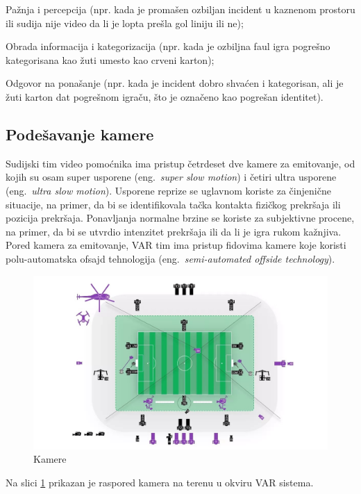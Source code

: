 \documentclass[a4paper]{article}
\begin{document}
Pažnja i percepcija (npr. kada je promašen ozbiljan incident u kaznenom prostoru ili sudija nije video da li je lopta prešla gol liniju ili ne);

Obrada informacija i kategorizacija (npr. kada je ozbiljna faul igra pogrešno kategorisana kao žuti umesto kao crveni karton);

Odgovor na ponašanje (npr. kada je incident dobro shvaćen i kategorisan, ali je žuti karton dat pogrešnom igraču, što je označeno kao pogrešan identitet).
\subsection{Podešavanje kamere}
Sudijski tim video pomoćnika ima pristup četrdeset dve kamere za emitovanje, od kojih su osam super usporene (eng.~{\em super slow motion}) i četiri ultra usporene (eng.~{\em ultra slow motion}). Usporene reprize se uglavnom koriste za činjenične situacije, na primer, da bi se identifikovala tačka kontakta fizičkog prekršaja ili pozicija prekršaja. Ponavljanja normalne brzine se koriste za subjektivne procene, na primer, da bi se utvrdio intenzitet prekršaja ili da li je igra rukom kažnjiva. Pored kamera za emitovanje, VAR tim ima pristup fidovima kamere koje koristi polu-automatska ofsajd tehnologija (eng.~{\em semi-automated offside technology}).


\begin{figure}[h!]
\begin{center}
\includegraphics[scale=0.35]{Var sistem.jpeg}
\end{center}
\caption{Kamere}
\label{fig:kamere}
\end{figure}

Na slici \ref{fig:kamere} prikazan je raspored kamera na terenu u okviru VAR sistema.
\end{document}
